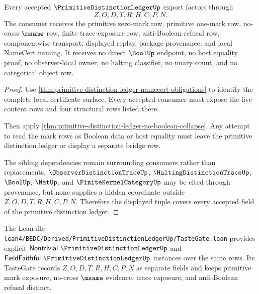 \begin{theorem}
\label{thm:primitive-distinction-ledger-field-coverage}
Every accepted $\PrimitiveDistinctionLedgerUp$ export factors through
$$
Z,O,D,T,R,H,C,P,N.
$$
The consumer receives the primitive zero-mark row, primitive one-mark row, no-cross $\msame$ row, finite trace-exposure row, anti-Boolean refusal row, componentwise transport, displayed replay, package provenance, and local NameCert naming. It receives no direct $\BoolUp$ endpoint, no host equality proof, no observer-local owner, no halting classifier, no unary count, and no categorical object row.
\end{theorem}
\begin{proof}
Use \autoref{thm:primitive-distinction-ledger-namecert-obligations} to identify the complete local certificate surface. Every accepted consumer must expose the five content rows and four structural rows listed there.

Then apply \autoref{thm:primitive-distinction-ledger-no-boolean-collapse}. Any attempt to read the mark rows as Boolean data or host equality must leave the primitive distinction ledger or display a separate bridge row.

The sibling dependencies remain surrounding consumers rather than replacements. $\ObserverDistinctionTraceUp$, $\HaltingDistinctionTraceUp$, $\BoolUp$, $\NatUp$, and $\FiniteKernelCategoryUp$ may be cited through provenance, but none supplies a hidden coordinate outside $Z,O,D,T,R,H,C,P,N$. Therefore the displayed tuple covers every accepted field of the primitive distinction ledger.
\end{proof}

The Lean file \texttt{lean4/BEDC/Derived/PrimitiveDistinctionLedgerUp/TasteGate.lean} provides explicit $\mathsf{Nontrivial}\ \PrimitiveDistinctionLedgerUp$ and $\mathsf{FieldFaithful}\ \PrimitiveDistinctionLedgerUp$ instances over the same rows. Its TasteGate records $Z,O,D,T,R,H,C,P,N$ as separate fields and keeps primitive mark exposure, no-cross $\msame$ evidence, trace exposure, and anti-Boolean refusal distinct.


